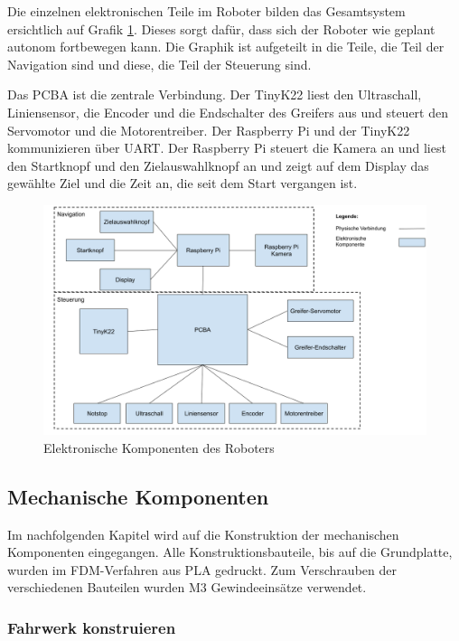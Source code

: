 Die einzelnen elektronischen Teile im Roboter bilden das Gesamtsystem ersichtlich auf Grafik \ref{fig:electro-components}. Dieses sorgt dafür, dass sich der Roboter wie geplant autonom fortbewegen kann.  Die Graphik ist aufgeteilt in die Teile, die Teil der Navigation sind und diese, die Teil der Steuerung sind. 

Das PCBA ist die zentrale Verbindung. Der TinyK22 liest den Ultraschall, Liniensensor, die Encoder und die Endschalter des Greifers aus und steuert den Servomotor und die Motorentreiber. Der Raspberry Pi und der TinyK22 kommunizieren über UART. Der Raspberry Pi steuert die Kamera an und liest den Startknopf und den Zielauswahlknopf an und zeigt auf dem Display das gewählte Ziel und die Zeit an, die seit dem Start vergangen ist.


\begin{figure}[H]
\centering
\includegraphics[width=\textwidth]{assets/gesamtkonzept/electronics.png}
\caption{Elektronische Komponenten des Roboters}
\label{fig:electro-components}
\end{figure} 

\newpage

\subsection{Mechanische Komponenten}
\label{Mechanische Komponenten}

Im nachfolgenden Kapitel wird auf die Konstruktion der mechanischen Komponenten eingegangen. Alle Konstruktionsbauteile, bis auf die Grundplatte, wurden im FDM-Verfahren aus PLA gedruckt. Zum Verschrauben der verschiedenen Bauteilen wurden M3 Gewindeeinsätze verwendet.

\subsubsection{Fahrwerk konstruieren}
\label{Fahrwerk konstruieren}

